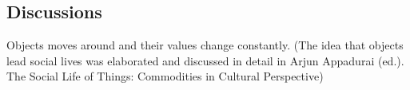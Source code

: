 








\subsection{Discussions}
Objects moves around and their values change constantly. (The idea that objects lead social lives was elaborated and discussed in detail in Arjun Appadurai (ed.). The Social Life of Things: Commodities in Cultural Perspective)

